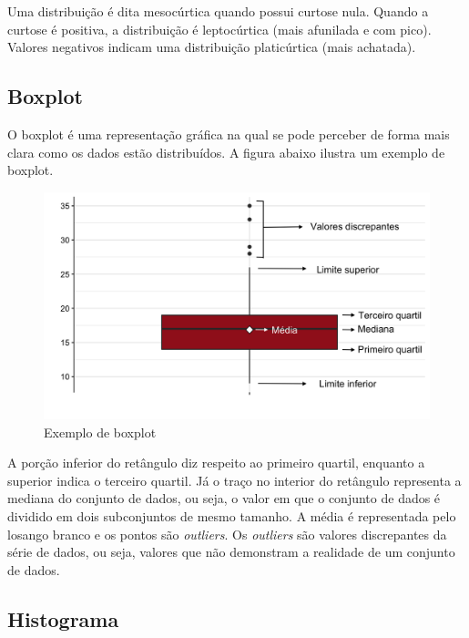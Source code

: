 \documentclass[
]{estat/estat}
\begin{document}
Uma distribuição é dita mesocúrtica quando possui curtose nula. Quando a
curtose é positiva, a distribuição é leptocúrtica (mais afunilada e com
pico). Valores negativos indicam uma distribuição platicúrtica (mais
achatada).

\subsection{Boxplot}\label{boxplot}

O boxplot é uma representação gráfica na qual se pode perceber de forma
mais clara como os dados estão distribuídos. A figura abaixo ilustra um
exemplo de boxplot.

\begin{figure}[H]

\caption{Exemplo de boxplot}

{\centering \includegraphics{images/box_uni.png}

}

\end{figure}%

A porção inferior do retângulo diz respeito ao primeiro quartil,
enquanto a superior indica o terceiro quartil. Já o traço no interior do
retângulo representa a mediana do conjunto de dados, ou seja, o valor em
que o conjunto de dados é dividido em dois subconjuntos de mesmo
tamanho. A média é representada pelo losango branco e os pontos são
\emph{outliers}. Os \emph{outliers} são valores discrepantes da série de
dados, ou seja, valores que não demonstram a realidade de um conjunto de
dados.

\subsection{Histograma}\label{histograma}
\end{document}
